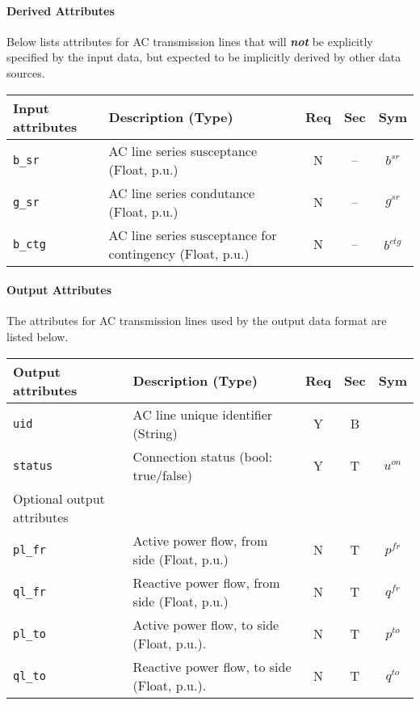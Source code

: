\documentclass{article}
\begin{document}
\paragraph{Derived Attributes}
Below lists attributes for AC transmission lines that 
will \textit{\textbf{not}} be explicitly 
specified by the input data, but 
expected to be implicitly derived by other data sources.

\begin{center}
\small
\begin{tabular}{ l | l | c | c | c | }
Input attributes & Description (Type)& Req & Sec & Sym\\
\hline
  {\tt b\_sr} & AC line series susceptance (Float, p.u.)& N & -- & $b^{sr}$\\   
  {\tt g\_sr} & AC line series condutance  (Float, p.u.)& N & -- & $g^{sr}$\\   
  {\tt b\_ctg} & {AC line series susceptance for contingency (Float, p.u.)}& N & -- & $b^{ctg}$\\
  \hline
\end{tabular}
\end{center}

\paragraph{Output Attributes}
The attributes for AC transmission lines used by the output data format are listed below.
\begin{center}
\small
\begin{tabular}{ l | l | c | c | c |}
Output attributes & Description (Type)& Req & Sec & Sym\\
\hline
 {\tt uid} & AC line unique identifier (String)& Y & B & \\
 {\tt status} & Connection status (bool: true/false) & Y & T & $u^{on}$ \\  
\hline
  Optional output attributes &   &  & & \\
\hline
 {\tt pl\_fr} & Active power flow, from side (Float, p.u.)  & N & T & $p^{fr}$ \\
 {\tt ql\_fr} & Reactive power flow, from side (Float, p.u.)& N & T & $q^{fr}$ \\
 {\tt pl\_to} & Active power flow, to side (Float, p.u.).   & N & T & $p^{to}$ \\
 {\tt ql\_to} & Reactive power flow, to side (Float, p.u.). & N & T & $q^{to}$ \\
\hline 
\end{tabular}
\end{center}
\end{document}

